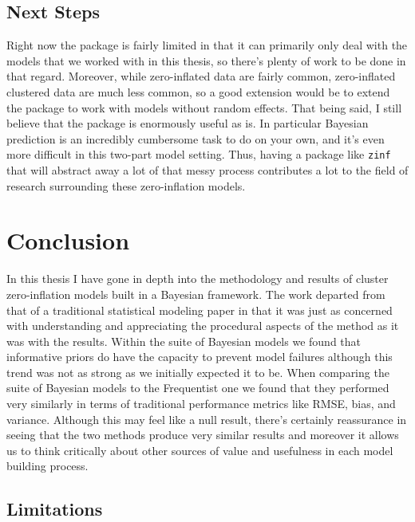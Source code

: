 \documentclass[12pt,twoside]{reedthesis}
\begin{document}
\hypertarget{next-steps}{%
\section{Next Steps}\label{next-steps}}

Right now the package is fairly limited in that it can primarily only deal with the models that we worked with in this thesis, so there's plenty of work to be done in that regard. Moreover, while zero-inflated data are fairly common, zero-inflated clustered data are much less common, so a good extension would be to extend the package to work with models without random effects. That being said, I still believe that the package is enormously useful as is. In particular Bayesian prediction is an incredibly cumbersome task to do on your own, and it's even more difficult in this two-part model setting. Thus, having a package like \texttt{zinf} that will abstract away a lot of that messy process contributes a lot to the field of research surrounding these zero-inflation models.

\hypertarget{conc}{%
\chapter{Conclusion}\label{conc}}

In this thesis I have gone in depth into the methodology and results of cluster zero-inflation models built in a Bayesian framework. The work departed from that of a traditional statistical modeling paper in that it was just as concerned with understanding and appreciating the procedural aspects of the method as it was with the results. Within the suite of Bayesian models we found that informative priors do have the capacity to prevent model failures although this trend was not as strong as we initially expected it to be. When comparing the suite of Bayesian models to the Frequentist one we found that they performed very similarly in terms of traditional performance metrics like RMSE, bias, and variance. Although this may feel like a null result, there's certainly reassurance in seeing that the two methods produce very similar results and moreover it allows us to think critically about other sources of value and usefulness in each model building process.

\hypertarget{limitations}{%
\section{Limitations}\label{limitations}}
\end{document}
